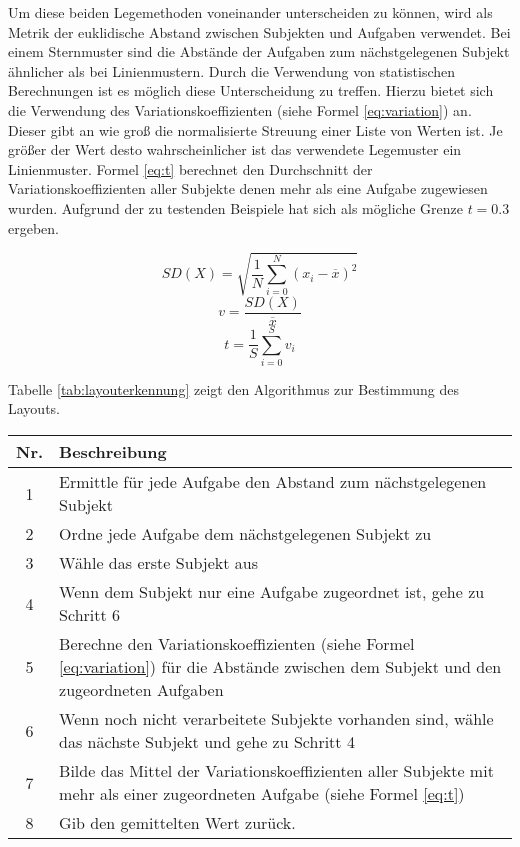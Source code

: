 Um diese beiden Legemethoden voneinander unterscheiden zu können, wird als Metrik der euklidische Abstand zwischen Subjekten und Aufgaben verwendet. Bei einem Sternmuster sind die Abstände der Aufgaben zum nächstgelegenen Subjekt ähnlicher als bei Linienmustern. Durch die Verwendung von statistischen Berechnungen ist es möglich diese Unterscheidung zu treffen. Hierzu bietet sich die Verwendung des Variationskoeffizienten (siehe Formel \ref{eq:variation}) an. Dieser gibt an wie groß die normalisierte Streuung einer Liste von Werten ist. Je größer der Wert desto wahrscheinlicher ist das verwendete Legemuster ein Linienmuster. Formel \ref{eq:t} berechnet den Durchschnitt der Variationskoeffizienten aller Subjekte denen mehr als eine Aufgabe zugewiesen wurden. Aufgrund der zu testenden Beispiele hat sich als mögliche Grenze $t=0.3$ ergeben.

\begin{equation}
	\label{eq:deviation}
	SD(X)=\sqrt{\frac{1}{N}\sum_{i=0}^{N}\left(x_i - \overline{x}\right)^2} 
\end{equation}
\begin{equation}
	\label{eq:variation}
	v=\frac{SD(X)}{\overline{x}} 
\end{equation}
\begin{equation}
	\label{eq:t}
	t=\frac{1}{S}\sum_{i=0}^{S}v_{i}
\end{equation}

Tabelle \ref{tab:layouterkennung} zeigt den Algorithmus zur Bestimmung des Layouts.
\begin{center}
	\label{tab:layouterkennung}
	\begin{tabularx}
		{1.0\linewidth}{ c X } \textbf{Nr.} & \textbf{Beschreibung} \\
		\hline 1 & Ermittle für jede Aufgabe den Abstand zum nächstgelegenen Subjekt \\
		\hline 2 & Ordne jede Aufgabe dem nächstgelegenen Subjekt zu \\
		\hline 3 & Wähle das erste Subjekt aus \\
		\hline 4 & Wenn dem Subjekt nur eine Aufgabe zugeordnet ist, gehe zu Schritt 6 \\
		\hline 5 & Berechne den Variationskoeffizienten (siehe Formel  \ref{eq:variation}) für die Abstände zwischen dem Subjekt und den zugeordneten Aufgaben \\
		\hline 6 & Wenn noch nicht verarbeitete Subjekte vorhanden sind, wähle das nächste Subjekt und gehe zu Schritt 4 \\
		\hline 7 & Bilde das Mittel der Variationskoeffizienten aller Subjekte mit mehr als einer zugeordneten Aufgabe (siehe Formel \ref{eq:t})\\
		\hline 8 & Gib den gemittelten Wert zurück.
	\end{tabularx}
\end{center}

